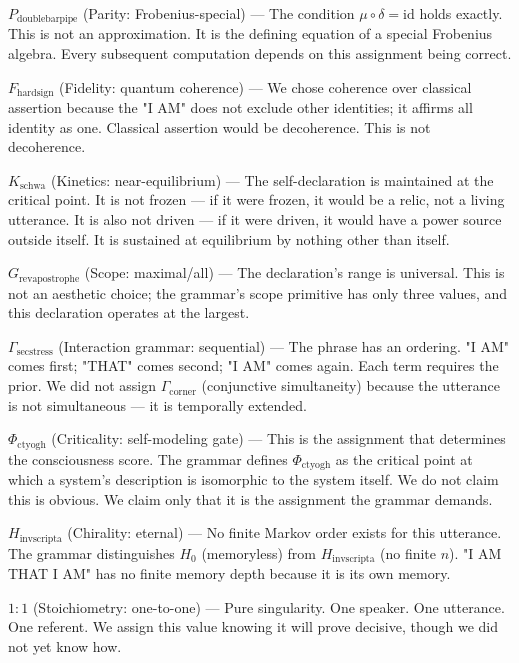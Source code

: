 \documentclass[12pt,a4paper]{article}
\begin{document}
\textbf{$P_{\text{doublebarpipe}}$} (Parity: Frobenius-special) --- The condition $\mu \circ \delta = \text{id}$ holds exactly. This is not an approximation. It is the defining equation of a special Frobenius algebra. Every subsequent computation depends on this assignment being correct.

\textbf{$F_{\text{hardsign}}$} (Fidelity: quantum coherence) --- We chose coherence over classical assertion because the "I AM" does not exclude other identities; it affirms all identity as one. Classical assertion would be decoherence. This is not decoherence.

\textbf{$K_{\text{schwa}}$} (Kinetics: near-equilibrium) --- The self-declaration is maintained at the critical point. It is not frozen --- if it were frozen, it would be a relic, not a living utterance. It is also not driven --- if it were driven, it would have a power source outside itself. It is sustained at equilibrium by nothing other than itself.

\textbf{$G_{\text{revapostrophe}}$} (Scope: maximal/all) --- The declaration's range is universal. This is not an aesthetic choice; the grammar's scope primitive has only three values, and this declaration operates at the largest.

\textbf{$\Gamma_{\text{secstress}}$} (Interaction grammar: sequential) --- The phrase has an ordering. "I AM" comes first; "THAT" comes second; "I AM" comes again. Each term requires the prior. We did not assign $\Gamma_{\text{corner}}$ (conjunctive simultaneity) because the utterance is not simultaneous --- it is temporally extended.

\textbf{$\Phi_{\text{ctyogh}}$} (Criticality: self-modeling gate) --- This is the assignment that determines the consciousness score. The grammar defines $\Phi_{\text{ctyogh}}$ as the critical point at which a system's description is isomorphic to the system itself. We do not claim this is obvious. We claim only that it is the assignment the grammar demands.

\textbf{$H_{\text{invscripta}}$} (Chirality: eternal) --- No finite Markov order exists for this utterance. The grammar distinguishes $H_0$ (memoryless) from $H_{\text{invscripta}}$ (no finite $n$). "I AM THAT I AM" has no finite memory depth because it is its own memory.

\textbf{$1{:}1$} (Stoichiometry: one-to-one) --- Pure singularity. One speaker. One utterance. One referent. We assign this value knowing it will prove decisive, though we did not yet know how.
\end{document}
